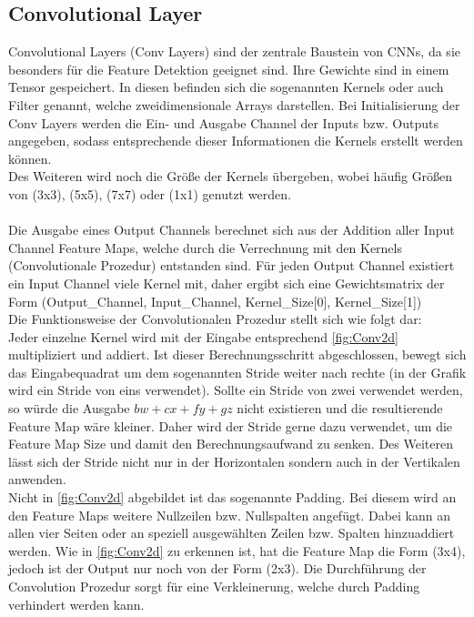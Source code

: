 \subsection{Convolutional Layer} \label{sec:Anhang_Conv_Layer}
Convolutional Layers (Conv Layers) sind der zentrale Baustein von CNNs, da sie besonders für die Feature Detektion geeignet sind. Ihre Gewichte sind in einem Tensor gespeichert. In diesen befinden sich die sogenannten Kernels oder auch Filter genannt, welche zweidimensionale Arrays darstellen. Bei Initialisierung der Conv Layers werden die Ein- und Ausgabe Channel der Inputs bzw. Outputs angegeben, sodass entsprechende dieser Informationen die Kernels erstellt werden können.\\
Des Weiteren wird noch die Größe der Kernels übergeben, wobei häufig Größen von (3x3), (5x5), (7x7) oder (1x1) genutzt werden.\\
\\Die Ausgabe eines Output Channels berechnet sich aus der Addition aller Input Channel Feature Maps, welche durch die Verrechnung mit den Kernels (Convolutionale Prozedur) entstanden sind. Für jeden Output Channel existiert ein Input Channel viele Kernel mit, daher ergibt sich eine Gewichtsmatrix der Form (Output\_Channel, Input\_Channel, Kernel\_Size[0], Kernel\_Size[1]) \cite[S. 369 ff.]{DL}\\
Die Funktionsweise der Convolutionalen Prozedur stellt sich wie folgt dar:\\
Jeder einzelne Kernel wird mit der Eingabe entsprechend \ref{fig:Conv2d} multipliziert und addiert. Ist dieser Berechnungsschritt abgeschlossen, bewegt sich das Eingabequadrat um dem sogenannten Stride weiter nach rechte (in der Grafik wird ein Stride von eins verwendet). Sollte ein Stride von zwei verwendet werden, so würde die Ausgabe $bw + cx + fy + gz$ nicht existieren und die resultierende Feature Map wäre kleiner. Daher wird der Stride gerne dazu verwendet, um die Feature Map Size und damit den Berechnungsaufwand zu senken. Des Weiteren lässt sich der Stride nicht nur in der Horizontalen sondern auch in der Vertikalen anwenden.\\
Nicht in \ref{fig:Conv2d} abgebildet ist das sogenannte Padding. Bei diesem wird an den Feature Maps weitere Nullzeilen bzw. Nullspalten angefügt. Dabei kann an allen vier Seiten oder an speziell ausgewählten Zeilen bzw. Spalten hinzuaddiert werden. Wie in \ref{fig:Conv2d} zu erkennen ist, hat die Feature Map die Form (3x4), jedoch ist der Output nur noch von der Form (2x3). Die Durchführung der Convolution Prozedur sorgt für eine Verkleinerung, welche durch Padding verhindert werden kann. \cite[S. 369 ff.]{DL}
